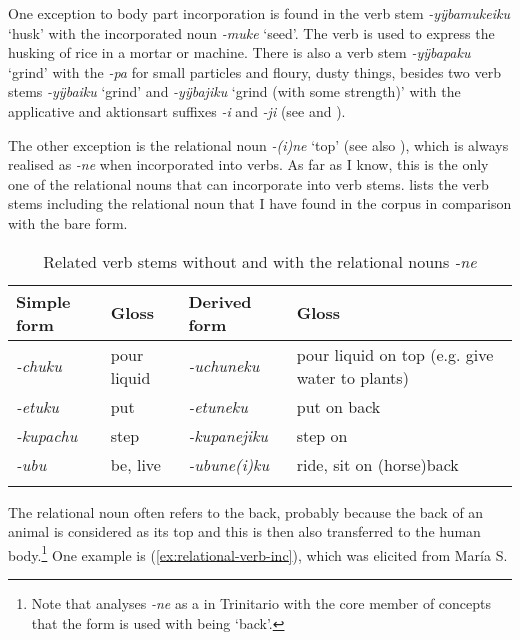One exception to body part incorporation is found in the verb stem \textit{-yÿba\-mukeiku} ‘husk’ with the incorporated noun \textit{-muke} ‘seed’. The verb is used to express the husking of rice in a mortar or machine. There is also a verb stem \textit{-yÿbapaku} ‘grind’ with the  \textit{-pa} for small particles and floury, dusty things, besides two verb stems \textit{-yÿbaiku} ‘grind’ and \textit{-yÿbajiku} ‘grind (with some strength)’ with the applicative and aktionsart suffixes \textit{-i} and \textit{-ji} (see  and ).

The other exception is the relational noun  \textit{-(i)ne} ‘top’ (see also ), which is always realised as \textit{-ne} when incorporated into verbs. As far as I know, this is the only one of the relational nouns that can incorporate into verb stems.  lists the verb stems including the relational noun that I have found in the corpus in comparison with the bare form. %

\begin{table}
\caption{Related verb stems without and with the relational nouns \textit{-ne}}

\begin{tabularx}{\textwidth}{lllQ}
\lsptoprule
Simple form & Gloss & Derived form & Gloss \\
\midrule
\textit{-chuku} & pour liquid & \textit{-uchuneku} & pour liquid on top (e.g. give water to plants)\\
\textit{-etuku} & put & \textit{-etuneku} & put on back\\
\textit{-kupachu} & step & \textit{-kupanejiku} & step on\\
\textit{-ubu} & be, live & \textit{-ubune(i)ku} & ride, sit on (horse)back\\
\lspbottomrule
\end{tabularx}

\label{table:DIR-ne-deriv}
\end{table}

The relational noun often refers to the back, probably because the back of an animal is considered as its top and this is then also transferred to the human body.\footnote{Note that \citet[464]{Rose2019b} analyses \textit{-ne} as a  in Trinitario with the core member of concepts that the form is used with being ‘back’.} One example is (\ref{ex:relational-verb-inc}), which was elicited from María S.

